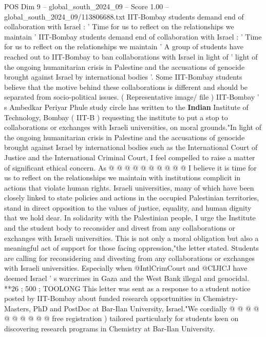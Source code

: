 \begin{textsample}{POS Dim 9 – global\_south\_2024\_09 – Score 1.00 – global\_south\_2024\_09/113806688.txt}  \label{ex:f9_pos_339}
IIT-Bombay students demand end of collaboration with Israel : ' Time for us to reflect on the relationships we maintain ' IIT-Bombay students demand end of collaboration with Israel : ' Time for us to reflect on the relationships we maintain ' A group of students have reached out to IIT-Bombay to ban collaborations with Israel in light of ' light of the ongoing humanitarian crisis in Palestine and the accusations of genocide brought against Israel by international bodies '.
Some IIT-Bombay students believe that the motive behind these collaborations is different and should be separated from socio-political issues. ( Representative image/ file ) IIT-Bombay ' s Ambedkar Periyar Phule study circle has written to the \textbf{Indian} Institute of Technology, Bombay ( IIT-B ) requesting the institute to put a stop to collaborations or exchanges with Israeli universities, on moral grounds."In light of the ongoing humanitarian crisis in Palestine and the accusations of genocide brought against Israel by international bodies such as the International Court of Justice and the International Criminal Court, I feel compelled to raise a matter of significant ethical concern.
As @ @ @ @ @ @ @ @ @ @ I believe it is time for us to reflect on the relationships we maintain with institutions complicit in actions that violate human rights.
Israeli universities, many of which have been closely linked to state policies and actions in the occupied Palestinian territories, stand in direct opposition to the values of justice, equality, and human dignity that we hold dear.
In solidarity with the Palestinian people, I urge the Institute and the student body to reconsider and divest from any collaborations or exchanges with Israeli universities.
This is not only a moral obligation but also a meaningful act of support for those facing oppression,"the letter stated.
Students are calling for reconsidering and divesting from any collaborations or exchanges with Israeli universities.
Especially when @IntlCrimCourt and @CIJICJ have deemed Israel ' s warcrimes in Gaza and the West Bank illegal and genocidal. **26 ; 500 ; TOOLONG This letter was sent as a response to a student notice posted by IIT-Bombay about funded research opportunities in Chemistry- Masters, PhD and PostDoc at Bar-Ilan University, Israel."We cordially @ @ @ @ @ @ @ @ @ @ free registration ) tailored particularly for students keen on discovering research programs in Chemistry at Bar-Ilan University.

\end{textsample}

